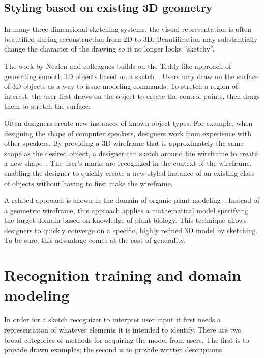 \subsection{Styling based on existing 3D geometry}

In many three-dimensional sketching systems, the visual representation
is often beautified during reconstruction from 2D to
3D. Beautification may substantially change the character of the
drawing so it no longer looks ``sketchy''. 

The work by Nealen and colleagues builds on the Teddy-like approach of
generating smooth 3D objects based on a
sketch~\cite{nealen-3d-sketch,nealen-fibermesh}. Users may draw on the
surface of 3D objects as a way to issue modeling commands. To stretch
a region of interest, the user first draws on the object to create the
control points, then drags them to stretch the surface.

Often designers create new instances of known object types. For
example, when designing the shape of computer speakers, designers work
from experience with other speakers. By providing a 3D wireframe that
is approximately the same shape as the desired object, a designer can
sketch around the wireframe to create a new
shape~\cite{mitani-3d-sketch,kara-3d-styling}. The user's marks are
recognized in the context of the wireframe, enabling the designer to
quickly create a new styled instance of an existing class of objects
without having to first make the wireframe.

A related approach is shown in the domain of organic plant
modeling~\cite{anastacio-plant-sketching}. Instead of a geometric
wireframe, this approach applies a mathematical model specifying the
target domain based on knowledge of plant biology. This technique
allows designers to quickly converge on a specific, highly refined 3D
model by sketching. To be sure, this advantage comes at the cost of
generality.

\section{Recognition training and domain modeling}
\label{sec:recognition-training}

In order for a sketch recognizer to interpret user input it first
needs a representation of whatever elements it is intended to
identify. There are two broad categories of methods for acquiring the
model from users. The first is to provide drawn examples; the second
is to provide written descriptions.

